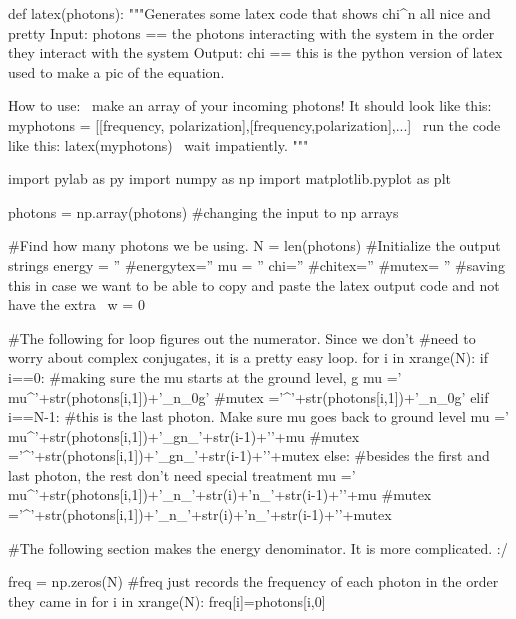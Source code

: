 \documentclass[11pt,a4paper,notitlepage]{article}
\begin{document}
\begin{code}
def latex(photons):
    """Generates some latex code that shows chi^n all nice and pretty
    Input:
        photons == the photons interacting with the system in the order
        they interact with the system
    Output:
        chi == this is the python version of latex used to make a pic of the
        equation.
        
    How to use:
        ~make an array of your incoming photons! It should look like this:
        myphotons = [[frequency, polarization],[frequency,polarization],...]
        ~run the code like this:
        latex(myphotons)
        ~wait impatiently.
    """
    
    import pylab as py
    import numpy as np
    import matplotlib.pyplot as plt
    
    photons = np.array(photons) #changing the input to np arrays
    
    #Find how many photons we be using.
    N = len(photons)
    #Initialize the output strings
    energy = ''
    #energytex=''
    mu = ''
    chi=''
    #chitex=''
    #mutex= '' #saving this in case we want to be able to copy and paste the latex output code and not have the extra \
    w = 0

  #The following for loop figures out the numerator. Since we don't
  #need to worry about complex conjugates, it is a pretty easy loop.  
    for i in xrange(N):
        if i==0: #making sure the mu starts at the ground level, g
            mu ='\\mu^{'+str(photons[i,1])+'}_{n_0g}'
            #mutex ='\mu^{'+str(photons[i,1])+'}_{n_0g}'
        elif i==N-1: #this is the last photon. Make sure mu goes back to ground level
            mu ='\\mu^{'+str(photons[i,1])+'}_{gn_'+str(i-1)+'}'+mu
            #mutex ='\mu^{'+str(photons[i,1])+'}_{gn_'+str(i-1)+'}'+mutex
        else: #besides the first and last photon, the rest don't need special treatment
            mu ='\\mu^{'+str(photons[i,1])+'}_{n_'+str(i)+'n_'+str(i-1)+'}'+mu
            #mutex ='\mu^{'+str(photons[i,1])+'}_{n_'+str(i)+'n_'+str(i-1)+'}'+mutex
            
    #The following section makes the energy denominator. It is more complicated. :/
    
    freq = np.zeros(N)
    #freq just records the frequency of each photon in the order they came in
    for i in xrange(N):
        freq[i]=photons[i,0]
        

\end{code}
\end{document}

